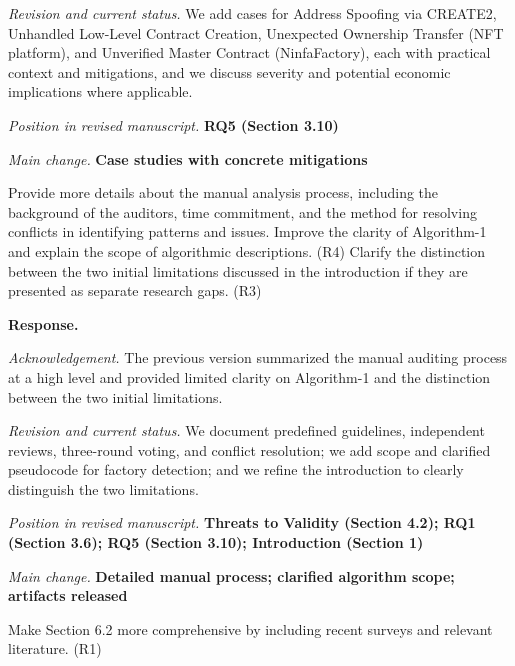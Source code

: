 \documentclass[acmsmall]{acmart}
\begin{document}
	\textit{Revision and current status.} We add cases for Address Spoofing via CREATE2, Unhandled
	Low-Level Contract Creation, Unexpected Ownership Transfer (NFT platform), and Unverified Master
	Contract (NinfaFactory), each with practical context and mitigations, and we discuss severity
	and potential economic implications where applicable.

	\vspace{0.25em}
	\textit{Position in revised manuscript.} {\color{red}\textbf{RQ5 (Section 3.10)}}

	\textit{Main change.} {\color{blue}\textbf{Case studies with concrete mitigations}}

	\begin{tcolorbox}
		[commentbox,title=Editor/AE -- Comment 5] Provide more details about the manual analysis
		process, including the background of the auditors, time commitment, and the method for resolving
		conflicts in identifying patterns and issues. Improve the clarity of Algorithm-1 and explain
		the scope of algorithmic descriptions. (R4) Clarify the distinction between the two initial limitations
		discussed in the introduction if they are presented as separate research gaps. (R3)
	\end{tcolorbox}

	\noindent
	\textbf{Response.}

	\textit{Acknowledgement.} The previous version summarized the manual auditing process at a high
	level and provided limited clarity on Algorithm-1 and the distinction between the two initial
	limitations.

	\textit{Revision and current status.} We document predefined guidelines, independent reviews, three-round
	voting, and conflict resolution; we add scope and clarified pseudocode for factory detection;
	and we refine the introduction to clearly distinguish the two limitations.

	\vspace{0.25em}
	\textit{Position in revised manuscript.} {\color{red}\textbf{Threats to Validity (Section 4.2); RQ1 (Section 3.6); RQ5 (Section 3.10); Introduction (Section 1)}}

	\textit{Main change.} {\color{blue}\textbf{Detailed manual process; clarified algorithm scope; artifacts released}}

	\begin{tcolorbox}
		[commentbox,title=Editor/AE -- Comment 6] Make Section 6.2 more comprehensive by including
		recent surveys and relevant literature. (R1)
	\end{tcolorbox}
\end{document}
